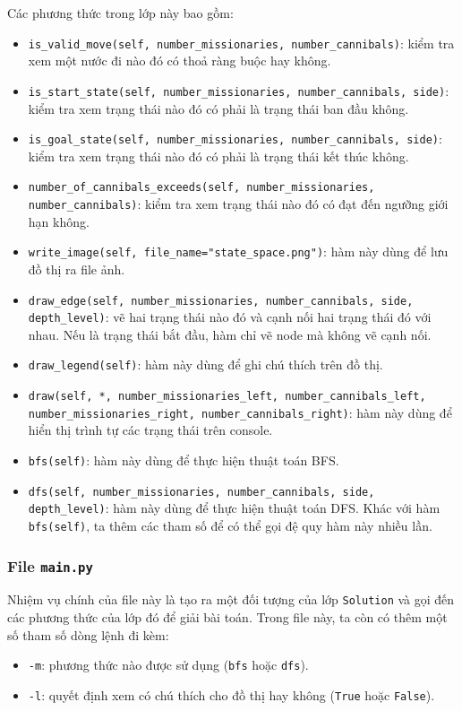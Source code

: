 \documentclass[a4paper, 11pt]{article}
\begin{document}
Các phương thức trong lớp này bao gồm:
\begin{itemize}
    \item \lstinline|is_valid_move(self, number_missionaries, number_cannibals)|: kiểm tra xem một nước đi nào đó có thoả ràng buộc hay không.
    \item \lstinline|is_start_state(self, number_missionaries, number_cannibals, side)|: kiểm tra xem trạng thái nào đó có phải là trạng thái ban đầu không.
    \item \lstinline|is_goal_state(self, number_missionaries, number_cannibals, side)|: kiểm tra xem trạng thái nào đó có phải là trạng thái kết thúc không.
    \item \lstinline|number_of_cannibals_exceeds(self, number_missionaries, number_cannibals)|: kiểm tra xem trạng thái nào đó có đạt đến ngưỡng giới hạn không.
    \item \lstinline|write_image(self, file_name="state_space.png")|: hàm này dùng để lưu đồ thị ra file ảnh.
    \item \lstinline|draw_edge(self, number_missionaries, number_cannibals, side, depth_level)|: vẽ hai trạng thái nào đó và cạnh nối hai trạng thái đó với nhau. Nếu là trạng thái bắt đầu, hàm chỉ vẽ node mà không vẽ cạnh nối.
    \item \lstinline|draw_legend(self)|: hàm này dùng để ghi chú thích trên đồ thị.
    \item \lstinline|draw(self, *, number_missionaries_left, number_cannibals_left,    number_missionaries_right, number_cannibals_right)|: hàm này dùng để hiển thị trình tự các trạng thái trên console.
    \item \lstinline|bfs(self)|: hàm này dùng để thực hiện thuật toán BFS.
    \item \lstinline|dfs(self, number_missionaries, number_cannibals, side, depth_level)|: hàm này dùng để thực hiện thuật toán DFS. Khác với hàm  \lstinline|bfs(self)|, ta thêm các tham số để có thể gọi đệ quy hàm này nhiều lần.
\end{itemize}

\subsubsection{File \lstinline|main.py|}
Nhiệm vụ chính của file này là tạo ra một đối tượng của lớp \lstinline|Solution| và gọi đến các phương thức của lớp đó để giải bài toán. Trong file này, ta còn có thêm một số tham số dòng lệnh đi kèm:
\begin{itemize}
    \item \lstinline|-m|: phương thức nào được sử dụng (\lstinline|bfs| hoặc \lstinline|dfs|).
    \item \lstinline|-l|: quyết định xem có chú thích cho đồ thị hay không (\lstinline|True| hoặc \lstinline|False|).
\end{itemize}
\end{document}
